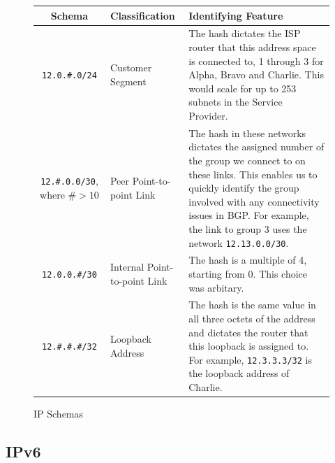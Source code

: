 \begin{figure}[!ht]
    \caption{IP Schemas}
    \label{figure:network-alloc-2}
    \centering
    \begin{tabular}{|c|p{3cm}|p{6cm}|}
        \hline
        \textbf{Schema} & \textbf{Classification} & \textbf{Identifying Feature} \\

        \hline
        \texttt{12.0.\#.0/24} & Customer Segment & The hash dictates the ISP
        router that this address space is connected to, 1 through 3 for Alpha,
        Bravo and Charlie. This would scale for up to 253 subnets in the
        Service Provider.\\

        \hline

        \texttt{12.\#.0.0/30}, where $\#> 10$ & Peer Point-to-point Link &
        The hash in these networks dictates the assigned number of the group we
        connect to on these links. This enables us to quickly identify the
        group involved with any connectivity issues in BGP. For example, the
        link to group 3 uses the network \texttt{12.13.0.0/30}.\\

        \hline
        \texttt{12.0.0.\#/30} & Internal Point-to-point Link &
        The hash is a multiple of 4, starting from 0. This choice was
        arbitary.\\

        \hline
        \texttt{12.\#.\#.\#/32} & Loopback Address & The hash is the same value
        in all three octets of the address and dictates the router that this
        loopback is assigned to. For example, \texttt{12.3.3.3/32} is the loopback
        address of Charlie.\\
        \hline
    \end{tabular}
\end{figure}
\clearpage

\subsection{IPv6}